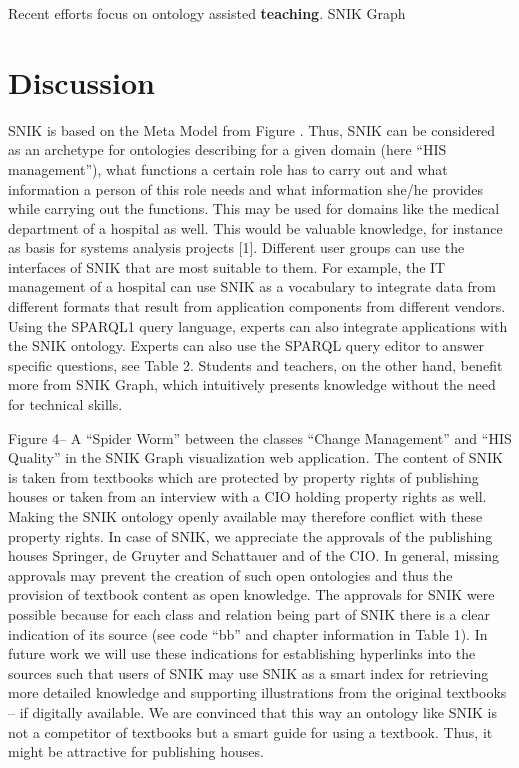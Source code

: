 \documentclass[sw]{iosart2x}
\renewcommand{\citep}{\cite}%
\begin{document}
Recent efforts focus on ontology assisted \textbf{teaching}. 
SNIK Graph~\citep{snikgraph}

\section{Discussion}
SNIK is based on the Meta Model from Figure .
Thus, SNIK can be considered as an archetype for ontologies describing for a given domain (here “HIS management”), what functions a certain role has to carry out and what information a person of this role needs and what information she/he provides while carrying out the functions.
This may be used for domains like the medical department of a hospital as well.
This would be valuable knowledge, for instance as basis for systems analysis projects [1].
Different user groups can use the interfaces of SNIK that are most suitable to them.
For example, the IT management of a hospital can use SNIK as a vocabulary to integrate data from different formats that result from application components from different vendors.
Using the SPARQL1 query language, experts can also integrate applications with the SNIK ontology.
 Experts can also use the SPARQL query editor to answer specific questions, see Table 2.
Students and teachers, on the other hand, benefit more from SNIK Graph, which intuitively presents knowledge without the need for technical skills.

Figure 4– A “Spider Worm” between the classes “Change Management” and “HIS Quality” in the SNIK Graph visualization web application.
The content of SNIK is taken from textbooks which are protected by property rights of publishing houses or taken from an interview with a CIO holding property rights as well. Making the SNIK ontology openly available may therefore conflict with these property rights. In case of SNIK, we appreciate the approvals of the publishing houses Springer, de Gruyter and Schattauer and of the CIO. In general, missing approvals may prevent the creation of such open ontologies and thus the provision of textbook content as open knowledge.
The approvals for SNIK were possible because for each class and relation being part of SNIK there is a clear indication of its source (see code “bb” and chapter information in Table 1). In future work we will use these indications for establishing hyperlinks into the sources such that users of SNIK may use SNIK as a smart index for retrieving more detailed knowledge and supporting illustrations from the original textbooks – if digitally available. We are convinced that this way an ontology like SNIK is not a competitor of textbooks but a smart guide for using a textbook. Thus, it might be attractive for publishing houses.
\end{document}
